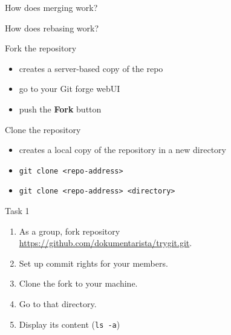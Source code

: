 \documentclass[14pt]{beamer}
\begin{document}
	\begin{frame}{How does merging work?}
	\begin{center}
	\end{center}
	\end{frame}

	\begin{frame}{How does rebasing work?}
	\begin{center}
	\end{center}
	\end{frame}

	\begin{frame}{Fork the repository}
	\begin{itemize}
		\item creates a server-based copy of the repo
		\item go to your Git forge webUI
		\item push the \textbf{Fork} button
	\end{itemize}
	\end{frame}


	\begin{frame}{Clone the repository}
	\begin{itemize}
		\item creates a local copy of the repository in a new directory
		\item \texttt{git clone <repo-address>}
		\item \texttt{git clone <repo-address> <directory>}
	\end{itemize}

	\end{frame}

	\begin{frame}{Task 1}
	\begin{enumerate}
		\item As a group, fork repository \\ {\small \url{https://github.com/dokumentarista/trygit.git}}.
		\item Set up commit rights for your members.
		\item Clone the fork to your machine.
		\item Go to that directory.
		\item Display its content (\texttt{ls -a})
	\end{enumerate}
	
	\end{frame}
\end{document}
